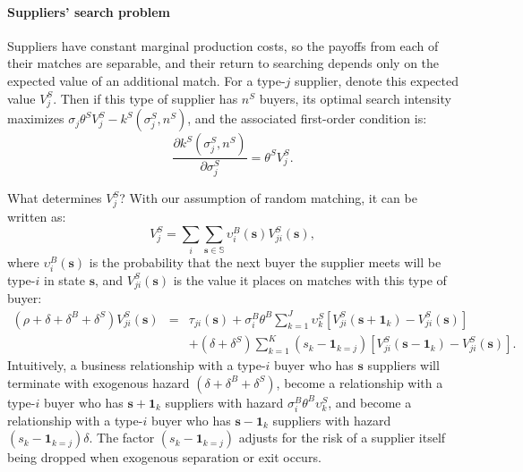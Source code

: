 \documentclass[12pt]{article} \usepackage{amsmath,amssymb,amsthm,geometry,graphicx,setspace,algorithm,algpseudocode,float}
\begin{document}
\paragraph{Suppliers' search problem} Suppliers have constant marginal production costs, so the payoffs from each of their matches are separable, and their return to searching depends only on the expected value of an additional match.  For a type-$j$ supplier, denote this expected value $V^S_j$.  Then if this type of supplier has $n^S$ buyers, its optimal search intensity maximizes  $\sigma_j\theta^SV_j^S-k^S(\sigma_j^S,n^S)$, and the associated first-order condition is: 
\begin{equation*}
\frac{\partial k^{S}\left( \sigma_j^{S},n^{S}\right) }{\partial \sigma_j^{S}}=\theta ^{S}V_{j}^{S}.  \label{foc_sell}
\end{equation*}
\par
What determines $V_j^S$? With our assumption of random matching, it can be written as:
\begin{equation*}
V_{j}^{S}=\sum_{i}\sum_{\mathbf{s}\in \mathbb{S}}\upsilon _{i}^{B}(\mathbf{s})V_{ji}^{S}(\mathbf{s}),
\label{eq:Vs_j}
\end{equation*}
where $\upsilon _{i}^{B}(\mathbf{s})$ is the probability that the next buyer the supplier meets will be type-$i$ in state $\mathbf{s}$, and  $V_{ji}^{S}(\mathbf{s})$ is the value it places on matches with this type of buyer: 
\begin{eqnarray}
(\rho + \delta +  \delta^B + \delta^S) V_{ji}^{S}(\mathbf{s}) &=&\tau _{ji}(\mathbf{s})+\sigma _{i}^{B}\theta ^{B}\sum_{k=1}^{J}\upsilon _{k}^{S}\left[ V_{ji}^{S}(%
\mathbf{s}+\mathbf{1}_{k})-V_{ji}^{S}(\mathbf{s})\right]\nonumber \\
&&+ (\delta + \delta^S) \sum_{k=1}^{K}\left( s_{k}-\mathbf{1}_{k=j}\right) \left[
V_{ji}^{S}(\mathbf{s}-\mathbf{1}_{k})-V_{ji}^{S}(\mathbf{s})\right].
\label{eq:Vs_ij}
\end{eqnarray}%
Intuitively, a business relationship with a type-$i$ buyer who has $%
\mathbf{s}$ suppliers will terminate with exogenous hazard $(\delta + \delta^B + \delta^S)$, become a relationship with a type-$i$ buyer who has $\mathbf{s}+\mathbf{1}_{k}$ suppliers with hazard $\sigma _{i}^{B}\theta ^{B}\upsilon_{k}^{S}$, and become a relationship with a type-$i$ buyer who has $\mathbf{s}-\mathbf{1}_{k}$ suppliers with hazard $\left( s_{k}-\mathbf{1}_{k=j}\right)\delta$. The factor $\left( s_{k}-\mathbf{1}_{k=j}\right)$ adjusts for the risk of a supplier itself being dropped when exogenous separation or exit occurs.
\par
\end{document}
